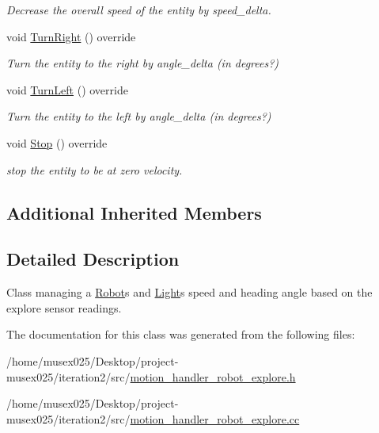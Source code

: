 \begin{DoxyCompactItemize}
\begin{DoxyCompactList}\small\item\em Decrease the overall speed of the entity by speed\+\_\+delta. \end{DoxyCompactList}\item 
void \hyperlink{classMotionHandlerRobotExplore_a2641f1d587f28f454f0455f6ccc98c3f}{Turn\+Right} () override\hypertarget{classMotionHandlerRobotExplore_a2641f1d587f28f454f0455f6ccc98c3f}{}\label{classMotionHandlerRobotExplore_a2641f1d587f28f454f0455f6ccc98c3f}

\begin{DoxyCompactList}\small\item\em Turn the entity to the right by angle\+\_\+delta (in degrees?) \end{DoxyCompactList}\item 
void \hyperlink{classMotionHandlerRobotExplore_a4abe8735e4f4d22757a544d075885402}{Turn\+Left} () override\hypertarget{classMotionHandlerRobotExplore_a4abe8735e4f4d22757a544d075885402}{}\label{classMotionHandlerRobotExplore_a4abe8735e4f4d22757a544d075885402}

\begin{DoxyCompactList}\small\item\em Turn the entity to the left by angle\+\_\+delta (in degrees?) \end{DoxyCompactList}\item 
void \hyperlink{classMotionHandlerRobotExplore_a975326a8f0719b6feb48a7aa24afe4ea}{Stop} () override\hypertarget{classMotionHandlerRobotExplore_a975326a8f0719b6feb48a7aa24afe4ea}{}\label{classMotionHandlerRobotExplore_a975326a8f0719b6feb48a7aa24afe4ea}

\begin{DoxyCompactList}\small\item\em stop the entity to be at zero velocity. \end{DoxyCompactList}\end{DoxyCompactItemize}
\subsection*{Additional Inherited Members}


\subsection{Detailed Description}
Class managing a \hyperlink{classRobot}{Robot}\textquotesingle{}s and \hyperlink{classLight}{Light}\textquotesingle{}s speed and heading angle based on the explore sensor readings. 

The documentation for this class was generated from the following files\+:\begin{DoxyCompactItemize}
\item 
/home/musex025/\+Desktop/project-\/musex025/iteration2/src/\hyperlink{motion__handler__robot__explore_8h}{motion\+\_\+handler\+\_\+robot\+\_\+explore.\+h}\item 
/home/musex025/\+Desktop/project-\/musex025/iteration2/src/\hyperlink{motion__handler__robot__explore_8cc}{motion\+\_\+handler\+\_\+robot\+\_\+explore.\+cc}\end{DoxyCompactItemize}
